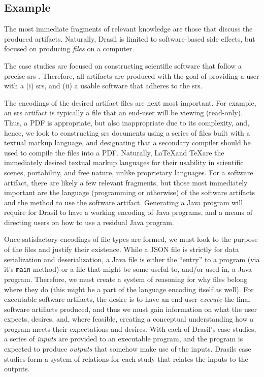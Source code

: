 \subsection{Example}

The most immediate fragments of relevant knowledge are those that discuss the
produced artifacts. Naturally, Drasil is limited to software-based side effects,
but focused on producing \textit{files} on a computer.

The case studies are focused on constructing scientific software that follow a
precise \acs{srs} \cite{SmithAndLai2005}. Therefore, all artifacts are produced
with the goal of providing a user with a (i) \acl{srs}, and (ii) a usable
software that adheres to the \acl{srs}.

The encodings of the desired artifact files are next most important. For
example, an \acs{srs} artifact is typically a file that an end-user will be
viewing (read-only). Thus, a PDF is appropriate, but also inappropriate due to
its complexity, and, hence, we look to constructing \acs{srs} documents using a
series of files built with a textual markup language, and designating that a
secondary compiler should be used to compile the files into a PDF. Naturally,
\LaTeX and \TeX are the immediately desired textual markup languages for their
usability in scientific scenes, portability, and free nature, unlike proprietary
languages. For a software artifact, there are likely a few relevant fragments,
but those most immediately important are the language (programming or otherwise)
of the software artifacts and the method to use the software artifact.
Generating a Java program will require for Drasil to have a working encoding of
Java programs, and a means of directing users on how to use a residual Java
program.

Once satisfactory encodings of file types are formed, we must look to the
purpose of the files and justify their existence. While a JSON file is strictly
for data serialization and deserialization, a Java file is either the ``entry''
to a program (via it's \texttt{main} method) or a file that might be some useful
to, and/or used in, a Java program. Therefore, we must create a system of
reasoning for why files belong where they do (this might be a part of the
language encoding itself as well). For executable software artifacts, the desire
is to have an end-user \textit{execute} the final software artifacts produced,
and thus we must gain information on what the user expects, desires, and, where
feasible, creating a conceptual understanding how a program meets their
expectations and desires. With each of Drasil's case studies, a series of
\textit{inputs} are provided to an executable program, and the program is
expected to produce \textit{outputs} that somehow make use of the inputs.
Drasils case studies form a system of relations for each study that relates the
inputs to the outputs.

